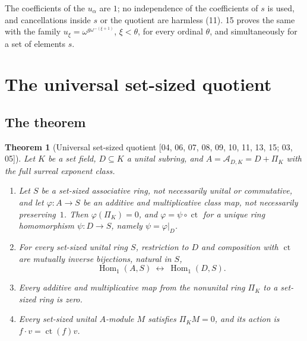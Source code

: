 \documentclass[11pt,letterpaper]{article}
\numberwithin{equation}{section}
\newtheorem{theorem}{Theorem}[section]
\theoremstyle{definition}
\theoremstyle{remark}
\theoremstyle{plain}
\newcommand{\A}{\mathcal A}          %
\newcommand{\ct}{\operatorname{ct}}
\newcommand{\Homone}{\operatorname{Hom}_1}
\newcommand{\src}[1]{\textup{\textsf{[#1]}}}
\begin{document}
The coefficients of the $u_\alpha$ are $1$; no independence of the coefficients of $s$ is
used, and cancellations inside $s$ or the quotient are harmless (11). 15 proves the same with the
family $u_\xi=\omega^{g\omega^{-(\xi+1)}}$, $\xi<\theta$, for every ordinal $\theta$, and simultaneously for a set
of elements $s$.

\section{The universal set-sized quotient}\label{osq:sec:universal}

\subsection{The theorem}\label{osq:sub:universalthm}

\begin{theorem}[Universal set-sized quotient \src{04, 06, 07, 08, 09, 10, 11, 13, 15; 03, 05}]\label{osq:thm:universal}
Let $K$ be a set field, $D\subseteq K$ a unital subring, and $A=\A_{D,K}=D+\Pi_K$ with the
full surreal exponent class.
\begin{enumerate}
\item Let $S$ be a set-sized associative ring, not necessarily unital or commutative, and
let $\varphi:A\to S$ be an additive and multiplicative class map, not necessarily
preserving~$1$. Then $\varphi(\Pi_K)=0$, and $\varphi=\psi\circ\ct$ for a unique ring
homomorphism $\psi:D\to S$, namely $\psi=\varphi|_D$.
\item For every set-sized unital ring $S$, restriction to $D$ and composition with $\ct$
are mutually inverse bijections, natural in $S$,
\[
 \Homone(A,S)\ \longleftrightarrow\ \Homone(D,S).
\]
\item Every additive and multiplicative map from the nonunital ring $\Pi_K$ to a set-sized
ring is zero.
\item Every set-sized unital $A$-module $M$ satisfies $\Pi_KM=0$, and its action is
$f\cdot v=\ct(f)v$.
\end{enumerate}
\end{theorem}
\end{document}
